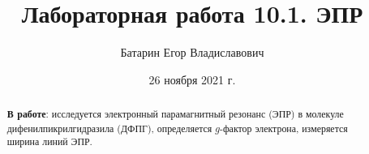 \documentclass[%
reprint,
amsmath,amssymb,
aps,
]{revtex4-2}
\begin{document}
	
	
	
	\title{Лабораторная работа 10.1. ЭПР}%
	
	
	
	\author{Батарин Егор Владиславович}
	
	
	\date{26 ноября 2021 г.}%
	
	
	\begin{abstract}
	\textbf{В работе}: исследуется электронный парамагнитный резонанс (ЭПР) в молекуле дифенилпикрилгидразила (ДФПГ), определяется $g$-фактор электрона, измеряется ширина линий ЭПР.

	\end{abstract}
	
	\maketitle
\end{document}
